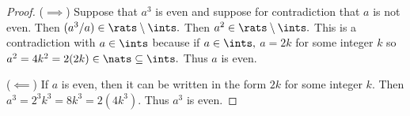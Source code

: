 \begin{proof}
    ($\implies$) Suppose that $a^3$ is even and suppose for contradiction that $a$ is not even. Then $(a^3/a)\in\rats\setminus\ints.$ Then $a^2\in\rats\setminus\ints.$ This is a contradiction with $a\in\ints$ because if $a\in\ints,$ $a=2k$ for some integer $k$ so $a^2=4k^2=2(2k)\in\nats\subseteq\ints.$ Thus $a$ is even.

    ($\impliedby$) If $a$ is even, then it can be written in the form $2k$ for some integer $k.$ Then $a^3=2^3k^3=8k^3=2(4k^3).$ Thus $a^3$ is even.
\end{proof}